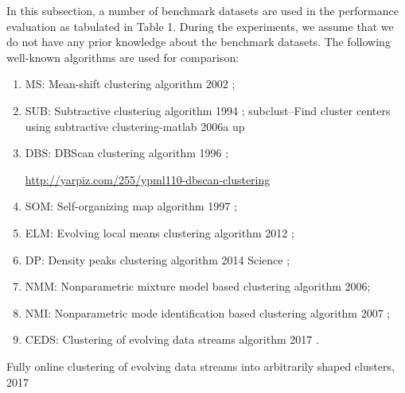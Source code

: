 In this subsection, a number of benchmark datasets are used in the performance evaluation as tabulated in Table 1. During the experiments, we assume that we do not have any prior knowledge about the benchmark datasets. The following well-known algorithms are used for comparison: 
\begin{enumerate}[label=\Roman*,align=left]
  \item MS: Mean-shift clustering algorithm 2002 \cite{DPComaniciu2002-5678};
  \item SUB: Subtractive clustering algorithm 1994 \cite{Chiu1994-5679};  subclust--Find cluster centers using subtractive clustering-matlab 2006a up
  \item DBS: DBScan clustering algorithm 1996 \cite{EsterKriegel1996-5680};

  \url{http://yarpiz.com/255/ypml110-dbscan-clustering}
  \item SOM: Self-organizing map algorithm 1997 \cite{Kohonen1997-5691};
  \item ELM: Evolving local means clustering algorithm 2012 \cite{RPDutta2012-5681};
  \item DP: Density peaks clustering algorithm 2014 Science \cite{RodriguezLaio2014-5691};
  \item NMM: Nonparametric mixture model based clustering algorithm 2006\cite{Blei2006-5683};
  \item NMI: Nonparametric mode identification based clustering algorithm 2007 \cite{LiRay2007-5690};
  \item CEDS: Clustering of evolving data streams algorithm 2017 \cite{HydeAngelov2017-5682}.
\end{enumerate}

Fully online clustering of evolving data streams into arbitrarily shaped clusters, 2017 \cite{HydeAngelov2017-5682} 

